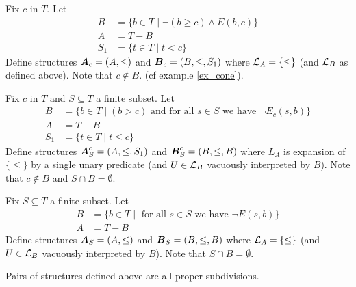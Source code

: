 \documentclass{amsart}
\DeclareMathOperator{\A}{\boldface A}
\DeclareMathOperator{\B}{\boldface B}
\begin{document}
\begin{Definition}
	Fix $c$ in $T$. Let
	\begin{align*}
		B &= \{b \in T \mid \neg(b \geq c) \wedge E(b,c)\} \\
		A &= T - B \\
		S_1 &= \{t \in T \mid t < c\}
	\end{align*}
	Define structures $\A_{c} = (A, \leq)$ and $\B_{c} = (B, \leq, S_1)$ where $\mathcal L_A = \{\leq\}$ (and $\mathcal L_B$ as defined above). Note that $c \notin B$. (cf example \ref{ex_cone}).
\end{Definition}

\begin{Definition}
	Fix $c$ in $T$ and $S \subseteq T$ a finite subset. Let
	\begin{align*}
		B &= \{b \in T \mid (b > c) \text{ and for all $s \in S$ we have } \neg E_c(s, b)\} \\
		A &= T - B \\
		S_1 &= \{t \in T \mid t \leq c\}
	\end{align*}
	Define structures $\A^{c}_{S} = (A, \leq, S_1)$ and $\B^{c}_{S} = (B, \leq, B)$ where $L_A$ is expansion of $\{\leq\}$ by a single unary predicate (and $U \in \mathcal L_B$ vacuously interpreted by $B$). Note that $c \notin B$ and $S \cap B = \emptyset$.
\end{Definition}

\begin{Definition}
	Fix $S \subseteq T$ a finite subset. Let
	\begin{align*}
		B &= \{b \in T \mid \text{ for all $s \in S$ we have } \neg E(s, b)\} \\
		A &= T - B
	\end{align*}
	Define structures $\A_{S} = (A, \leq)$ and $\B_{S} = (B, \leq, B)$ where $\mathcal L_A = \{\leq\}$ (and $U \in \mathcal L_B$ vacuously interpreted by $B$). Note that $S \cap B = \emptyset$.
\end{Definition}

\begin{Lemma}
	Pairs of structures defined above are all proper subdivisions.
\end{Lemma}
\end{document}
